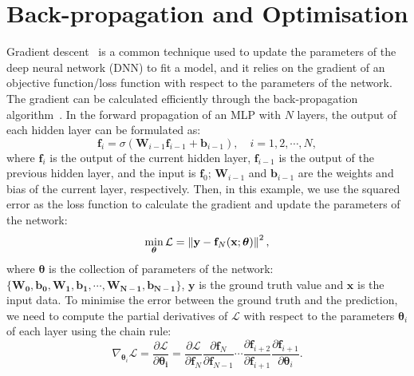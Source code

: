 \section{Back-propagation and Optimisation}
\label{ch3:bp}
Gradient descent~\cite{bottou2010large} is a common technique used to update the parameters of the deep neural network (DNN) to fit a model, and it relies on the gradient of an objective function/loss function with respect to the parameters of the network. The gradient can be calculated efficiently through the back-propagation algorithm~\cite{kelley1960gradient}. In the forward propagation of an MLP with $N$ layers, the output of each hidden layer can be formulated as:
\begin{equation}
    \mathbf{f}_{i} = \sigma(\mathbf{W}_{i-1}\mathbf{f}_{i-1} + \mathbf{b}_{i-1}), \quad i = 1, 2, \cdots, N,
\end{equation}
where $\mathbf{f}_{i}$ is the output of the current hidden layer, $\mathbf{f}_{i-1}$ is the output of the previous hidden layer, and the input is $\mathbf{f}_{0}$; $\mathbf{W}_{i-1}$ and $\mathbf{b}_{i-1}$ are the weights and bias of the current layer, respectively. Then, in this example, we use the squared error as the loss function to calculate the gradient and update the parameters of the network:
\begin{equation}
    \min_{\bm{\theta}}\mathcal{L} = \left\lVert\mathbf{y} - \mathbf{f}_{N}(\mathbf{x};\bm{\theta})\right\rVert^{2},
\end{equation}
where $\bm{\theta}$ is the collection of parameters of the network: $\{\mathbf{W_{0}}, \mathbf{b_{0}}, \mathbf{W_{1}}, \mathbf{b_{1}}, \cdots, \mathbf{W_{N-1}}, \mathbf{b_{N-1}}\}$, $\mathbf{y}$ is the ground truth value and $\mathbf{x}$ is the input data. To minimise the error between the ground truth and the prediction, we need to compute the partial derivatives of $\mathcal{L}$ with respect to the parameters $\bm{\theta}_{i}$ of each layer using the chain rule:
\begin{equation}
   \nabla_{\bm{\theta}_{i}}\mathcal{L} = \frac{\partial \mathcal{L}}{\partial \bm{\theta_{i}}} = \frac{\partial \mathcal{L}}{\partial \mathbf{f}_{N}} \frac{\partial\mathbf{f}_{N}}{\partial \mathbf{f}_{N-1}}\cdots \frac{\partial\mathbf{f}_{i+2}}{\partial \mathbf{f}_{i+1}} \frac{\partial\mathbf{f}_{i+1}}{\partial \bm{\theta}_{i}}.
\end{equation}

